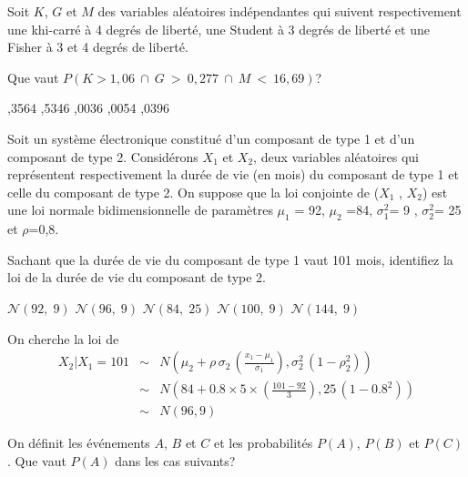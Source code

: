\begin{questions}
\vspace{0,5cm}
\question[3] Soit $K$, $G$ et $M$ des variables aléatoires indépendantes qui suivent respectivement une khi-carré à 4 degrés de liberté, une Student à 3 degrés de liberté et une Fisher à 3 et 4 degrés de liberté. 

Que vaut $P(K>1,06~\cap~G~>~0,277~\cap~M~<~16,69)$?

\begin{oneparcheckboxes}
		,3564
		,5346
		,0036
		,0054
		,0396
\end{oneparcheckboxes}

\vspace{0,5cm}
\question[3]\label{normaleBivariee}
Soit un système électronique constitué d'un composant de type 1 et d'un composant de type 2. Considérons ${X}_1 $ et ${X}_2 $, deux variables aléatoires qui représentent respectivement la durée de vie (en mois) du composant de type 1 et celle du composant de type 2. On suppose que la loi conjointe de (${X}_1 $ , ${X}_2 $) est une loi normale bidimensionnelle de paramètres ${\mu}_1 $ = 92, ${\mu}_2 $ =84, ${\sigma}_1 ^2$= 9 , ${\sigma}_2 ^2$=  25 et $\rho $=0,8.

Sachant que la durée de vie du composant de type 1 vaut 101 mois, identifiez la loi de la durée de vie du composant de type 2.

 \begin{oneparcheckboxes}
		\choice $\mathcal{N}(92, \; 9)$  %
		\correctchoice $\mathcal{N}(96,\;9)$ %
		\choice $\mathcal{N}(84,\; 25)$ %
		\choice $\mathcal{N}(100, \; 9)$ %
		\choice $\mathcal{N}(144, \; 9)$ %
\end{oneparcheckboxes}

\begin{solution}
On cherche la loi de
		\begin{eqnarray*}
			{X}_2|{X}_1=101 &\sim& N\left(\mu_2 +\rho\, \sigma_2\, \left(\frac{x_1-\mu_1}{\sigma_1}\right),\sigma_2^2 \,\left(1-\rho_2^2\right)\right)\\
			&\sim& N\left(84 +0.8\times 5\times \left(\frac{101-92}{3}\right),25 \,\left(1-0.8^2\right)\right)\\
			&\sim& N\left(96, 9 \right)
	\end{eqnarray*}
\end{solution}


\newpage


\newpage
\question\label{pa} On définit les événements $A$, $B$ et $C$ et les probabilités $P(A)$, $P(B)$ et $P(C)$. Que vaut $P(A)$ dans les cas suivants?
\begin{parts}

\end{parts}
\end{questions}
